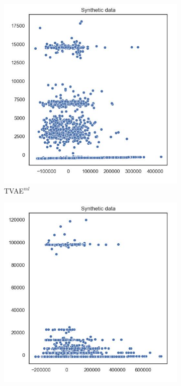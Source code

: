 \begin{figure}[H]
	\centering
	\begin{subfigure}{0.3\textwidth}
		\centering
		\includegraphics[width=\textwidth]{images/pca/tvae.jpg}
		\caption{TVAE$^{ml}$}
	\end{subfigure}
	\begin{subfigure}{0.3\textwidth}
		\centering
		\includegraphics[width=\textwidth]{images/pca/ctabgan.jpg}

\end{subfigure}
\end{figure}
